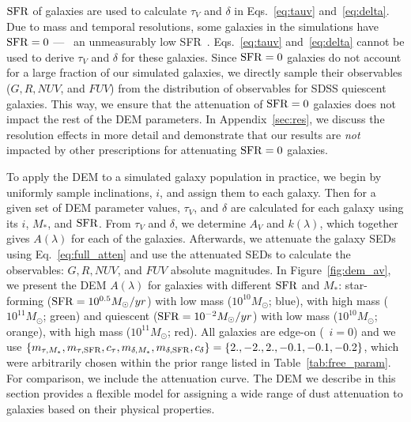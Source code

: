 
${\rm SFR}$ of galaxies are used to calculate $\tau_V$ and $\delta$ in
Eqs.~\ref{eq:tauv} and~\ref{eq:delta}. Due to mass and temporal resolutions,
some galaxies in the simulations have ${\rm SFR}=0$ --- \ie~an unmeasurably low
SFR~\citep{hahn2019c}. Eqs.~\ref{eq:tauv} and~\ref{eq:delta} cannot be used to
derive $\tau_V$ and $\delta$ for these galaxies. Since ${\rm SFR}=0$ galaxies do
not account for a large fraction of our simulated galaxies, we directly sample 
their observables ($G, R, NUV$, and $FUV$) from the distribution of observables
for SDSS quiescent galaxies. This way, we ensure that the attenuation of ${\rm SFR}=0$ 
galaxies does not impact the rest of the DEM parameters. In Appendix~\ref{sec:res}, 
we discuss the resolution effects in more detail and demonstrate that our results
are \emph{not} impacted by other prescriptions for attenuating ${\rm SFR}=0$ galaxies.

To apply the DEM to a simulated galaxy population in practice, we begin by
uniformly sample inclinations, $i$, and assign them to each galaxy. Then for a
given set of DEM parameter values, $\tau_V$, and $\delta$ are calculated for
each galaxy using its $i$, $M_*$, and ${\rm SFR}$. From $\tau_V$ and $\delta$, we
determine $A_V$ and $k(\lambda)$, which together gives $A(\lambda)$ for each of
the galaxies.  Afterwards, we attenuate the galaxy SEDs using Eq.~\ref{eq:full_atten} and use 
the attenuated SEDs to calculate the observables: $G, R, NUV$, and $FUV$
absolute magnitudes. In Figure~\ref{fig:dem_av}, we present the DEM
$A(\lambda)$
for galaxies with different ${\rm SFR}$ and $M_*$: 
star-forming (${\rm SFR}=10^{0.5}M_\odot/yr$) with low mass ($10^{10}M_\odot$;
blue), with high mass ($10^{11}M_\odot$; green) and quiescent
(${\rm SFR}=10^{-2}M_\odot/yr$) with low mass ($10^{10}M_\odot$; orange), with high
mass ($10^{11}M_\odot$; red). All galaxies are edge-on (\ie~$i=0$) and we use
$\{m_{\tau,M_*}, m_{\tau,{\rm SFR}}, c_\tau, m_{\delta,M_*}, m_{\delta,{\rm SFR}},
c_\delta\} = \{2., -2., 2., -0.1, -0.1, -0.2\}$, which were arbitrarily chosen
within the prior range listed in Table~\ref{tab:free_param}. For comparison, we 
include the \cite{calzetti2001} attenuation curve. The DEM we describe in this 
section provides a flexible model for assigning a wide range of dust attenuation 
to galaxies based on their physical properties. 

